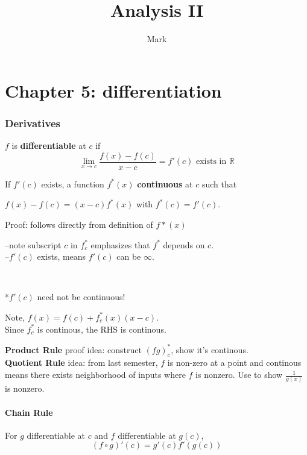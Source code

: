 \documentclass[12pt]{article}
\title{Analysis II}
\author{Mark}
\date{}
\newcommand{\bt}[1]{\textbf{#1}} %
\newcommand{\gray}[1]{\textcolor[gray]{0.5}{#1}} %
\begin{document}
\maketitle

\part*{Chapter 5: differentiation}
\section{Derivatives}

$f$ is \textbf{differentiable} at $c$ if 
$$\lim_{x \rightarrow c} \frac{f(x) - f(c)}{x - c} = f'(c) \text{ exists in } \mathbb{R}$$

If $f'(c)$ exists, a function $f^*(x)$ \bt{continuous} at $c$ such that\\
\centerline{$f(x) - f(c) = (x-c)f^*(x)$ with $f^*(c) = f'(c)$.}

\textcolor[gray]{0.5}{Proof: follows directly from definition of $f*(x)$
}

--note subscript $c$ in $f_c^*$ emphasizes that $f^*$ depends on $c$.\\
\indent --$f'(c)$ exists, means $f'(c)$ can be $\infty$.\\

\centerline{\\}
*$f'(c)$ need not be continuous!

\begin{center}
\textcolor[gray]{0.5}{
Note, $f(x) = f(c) + f_c^*(x)(x -c)$. \\
Since $f_c^*$ is continous, the RHS is continous. \\
}
\end{center}


\noindent \textbf{Product Rule}
\gray{proof idea: construct $(fg)_c^*$, show it's continous.}\\

\noindent \textbf{Quotient Rule}
\textcolor[gray]{0.5}{idea: from last semester, $f$ is non-zero at a point and continous means there exists neighborhood of inputs where $f$ is nonzero. Use to show $\frac{1}{g(x)}$ is nonzero.}

\subsection*{Chain Rule}
For $g$ differentiable at $c$ and $f$ differentiable at $g(c)$,
$$(f \circ g)'(c) = g'(c) f'(g(c))$$
\end{document}
